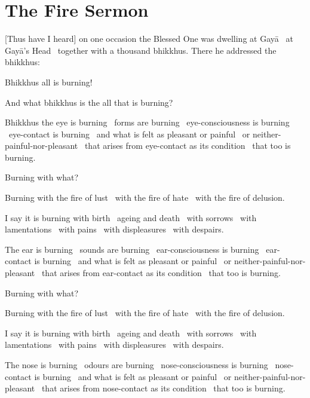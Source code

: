 \section{The Fire Sermon}
\label{fire-sermon}

[Thus have I heard] on one occasion the Blessed One was dwelling at Gayā \breathmark\ at Gayā’s Head \breathmark\ together with a thousand bhikkhus. There he addressed the bhikkhus:

Bhikkhus all is burning!

And what bhikkhus is the all that is burning?

Bhikkhus the eye is burning \breathmark\ forms are burning \breathmark\ eye-consciousness is burning \breathmark\ eye-contact is burning \breathmark\ and what is felt as pleasant or painful \breathmark\ or neither-painful-nor-pleasant \breathmark\ that arises from eye-contact as its condition \breathmark\ that too is burning.

Burning with what?

Burning with the fire of lust \breathmark\ with the fire of hate \breathmark\ with the fire of delusion.

I say it is burning with birth \breathmark\ ageing and death \breathmark\ with sorrows \breathmark\ with lamentations \breathmark\ with pains \breathmark\ with displeasures \breathmark\ with despairs.

The ear is burning \breathmark\ sounds are burning \breathmark\ ear-consciousness is burning \breathmark\ ear-contact is burning \breathmark\ and what is felt as pleasant or painful \breathmark\ or neither-painful-nor-pleasant \breathmark\ that arises from ear-contact as its condition \breathmark\ that too is burning.

Burning with what?

Burning with the fire of lust \breathmark\ with the fire of hate \breathmark\ with the fire of delusion.

I say it is burning with birth \breathmark\ ageing and death \breathmark\ with sorrows \breathmark\ with lamentations \breathmark\ with pains \breathmark\ with displeasures \breathmark\ with despairs.

The nose is burning \breathmark\ odours are burning \breathmark\ nose-consciousness is burning \breathmark\ nose-contact is burning \breathmark\ and what is felt as pleasant or painful \breathmark\ or neither-painful-nor-pleasant \breathmark\ that arises from nose-contact as its condition \breathmark\ that too is burning.

